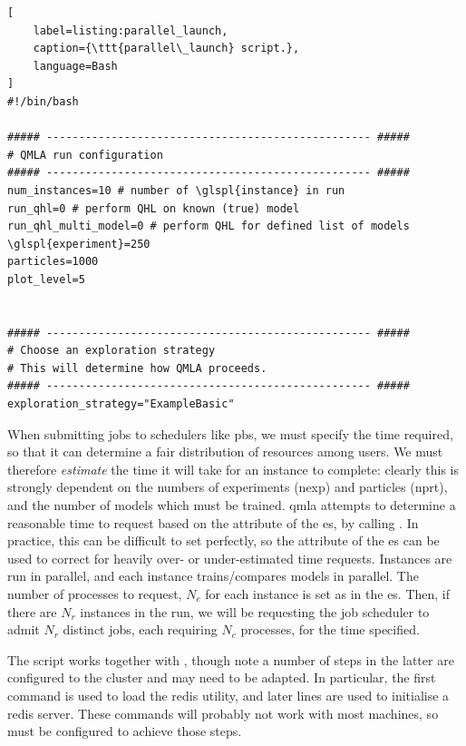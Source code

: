 \begin{lstlisting}[
    label=listing:parallel_launch,
    caption={\ttt{parallel\_launch} script.},
    language=Bash
]
#!/bin/bash

##### -------------------------------------------------- #####
# QMLA run configuration
##### -------------------------------------------------- #####
num_instances=10 # number of \glspl{instance} in run
run_qhl=0 # perform QHL on known (true) model
run_qhl_multi_model=0 # perform QHL for defined list of models
\glspl{experiment}=250
particles=1000
plot_level=5


##### -------------------------------------------------- #####
# Choose an exploration strategy 
# This will determine how QMLA proceeds. 
##### -------------------------------------------------- #####
exploration_strategy="ExampleBasic"
\end{lstlisting}    

\par 

When submitting jobs to schedulers like \gls{pbs}, we must specify the time required, 
    so that it can determine a fair distribution of resources among users. 
We must therefore \emph{estimate} the time it will take for an \gls{instance} to complete:
    clearly this is strongly dependent on the numbers of \glspl{experiment} (\gls{nexp}) and particles (\gls{nprt}), 
    and the number of models which must be trained. 
\gls{qmla} attempts to determine a reasonable time to request based on the 
    attribute of the \gls{es}, by calling . 
In practice, this can be difficult to set perfectly,
    so the  attribute of the \gls{es} can be used to correct 
    for heavily over- or under-estimated time requests. 
Instances are run in parallel, and each \gls{instance} trains/compares models in parallel. 
The number of processes to request, $N_c$ for each \gls{instance} is set as  
        in the \gls{es}.
Then, if there are $N_r$ \glspl{instance} in the run, we will be requesting the job scheduler to admit 
    $N_r$ distinct jobs, each requiring $N_c$ processes, for the time specified. 

\par 

The  script works together with , 
    though note a number of steps in the latter are configured to the cluster and may need to be adapted. 
In particular, the first command is used to load the redis utility, and later lines are used to initialise a 
redis server. 
These commands will probably not work with most machines, so must be configured to achieve those steps. 


